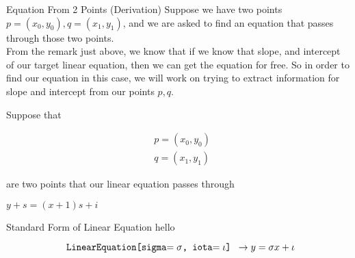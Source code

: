 \documentclass{book}
\begin{document}
  {\remark Equation From 2 Points (Derivation) 
    Suppose we have two points $p = (x_0, y_0), q = (x_1, y_1)$, and we are asked to find an equation that passes through those two points.\\

    From the remark just above, we know that if we know that slope, and intercept of our target linear equation, then we can get the equation for free. So in order to find our equation in this case, we will work on trying to extract information for slope and intercept from our points $p, q$.

    Suppose that

    \begin{align*}
      & p = (x_0, y_0)\\
      & q = (x_1, y_1)
    \end{align*}

    are two points that our linear equation passes through

    $y + s = (x + 1)s + i$
  }

  {\remark Standard Form of Linear Equation 
    hello

    $$\text{\texttt{ LinearEquation[sigma$= {\sigma}$, iota$= {\iota}$] }}\to y = {\sigma}x + {\iota}$$
  }
\end{document}

